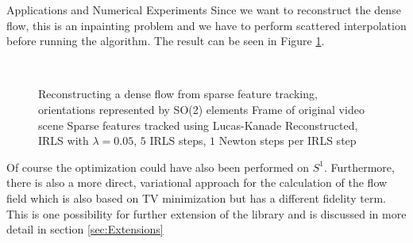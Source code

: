 \begin{chapter}{Applications and Numerical Experiments}
Since we want to reconstruct the dense flow, this is an inpainting problem and we have to perform scattered interpolation before running the algorithm. The result can be seen in 
Figure \ref{fig:application_flowfield1}.
\begin{figure}[h!]
    \centering
    \\
    \caption[Dense optical flow reconstruction]{Reconstructing a dense flow from sparse feature tracking, orientations represented by SO(2) elements
	 Frame of original video scene 
	 Sparse features tracked using Lucas-Kanade
	 Reconstructed, IRLS with $\lambda=0.05$, $5$ IRLS steps, $1$ Newton steps per IRLS step
	\label{fig:application_flowfield1}
    }
\end{figure}

Of course the optimization could have also been performed on $S^1$. Furthermore, there is also a more direct, variational approach for the calculation of the flow field
which is also based on TV minimization but has a different fidelity term. This is one possibility for further extension of the library and is discussed in more detail in 
section \ref{sec:Extensions}


\end{chapter}
